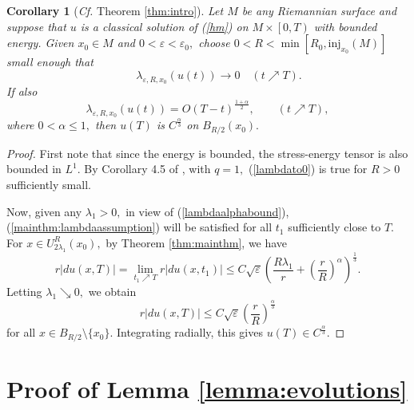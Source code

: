 \documentclass[12pt]{amsart}
\newcommand{\LB}{\left[}
\newcommand{\RB}{\right]}
\newcommand{\inj}{{\mathrm{inj} }}
\newtheorem{cor}[thm]{Corollary}
\theoremstyle{others}
\numberwithin{equation}{section}
\newcommand{\eps}{\varepsilon}
\begin{document}
\begin{cor}[{\it Cf.} Theorem \ref{thm:intro}]\label{cor:detailedthm} Let $M$ be any Riemannian surface and suppose that $u$ is a classical solution of (\ref{hm}) on $M\times \LB 0, T \right)$
with bounded energy. Given $x_0 \in M$ and $0 < \eps < \eps_0,$ choose $0 < R < \min \LB R_0, \inj_{x_0}(M) \RB$ small enough that
\begin{equation}\label{lambdato0}
\qquad \lambda_{\eps, R, x_0} (u(t)) \to 0 \quad (t \nearrow T).
\end{equation}
If also
\begin{equation}\label{lambdaalphabound}
\lambda_{\eps, R, x_0} (u(t)) = O(T - t)^{\frac{1 + \alpha}{2}}, \qquad (t \nearrow T),
\end{equation}
where $0 < \alpha \leq 1,$ then $u(T)$ is $C^{\frac{\alpha}{3} }$ on $B_{R/2}(x_0).$
\end{cor}
\begin{proof} First note that since the energy is bounded, the stress-energy tensor is also bounded in $L^1.$ By Corollary 4.5 of \cite{songwaldron}, with $q = 1,$ (\ref{lambdato0}) is true for $R > 0$ sufficiently small.

Now, given any $\lambda_1 > 0,$ in view of (\ref{lambdaalphabound}), (\ref{mainthm:lambdaassumption}) will be satisfied for all $t_1$ sufficiently close to $T.$  %
For $x \in U_{2\lambda_1}^R(x_0),$ by Theorem \ref{thm:mainthm}, we have
\begin{equation*}
r|du(x,T)| = \lim_{t_1 \nearrow T} r|du(x,t_1)| \leq C \sqrt{\eps} \left( \frac{R\lambda_1}{r} + \left( \frac{r}{R} \right)^\alpha \right)^{\frac13}.
\end{equation*}
Letting $\lambda_1 \searrow 0,$ we obtain
\begin{equation*}
r|du(x,T)| \leq C\sqrt{\eps} \left( \frac{r}{R} \right)^{ \frac{\alpha}{3}}
\end{equation*}
for all $x \in B_{R/2} \setminus \{x_0\}.$
Integrating radially, this gives $u(T) \in C^{\frac{\alpha}{3}}.$ %
\end{proof}


\appendix





\section{Proof of Lemma \ref{lemma:evolutions}}\label{app:evolutions}
\end{document}
